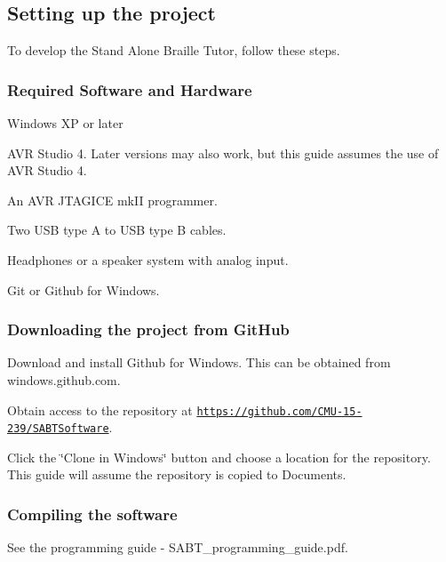 \subsection*{Setting up the project}

To develop the Stand Alone Braille Tutor, follow these steps.

\subsubsection*{Required Software and Hardware}


\begin{DoxyItemize}
\item Windows X\-P or later
\item A\-V\-R Studio 4. Later versions may also work, but this guide assumes the use of A\-V\-R Studio 4.
\item An A\-V\-R J\-T\-A\-G\-I\-C\-E mk\-I\-I programmer.
\item Two U\-S\-B type A to U\-S\-B type B cables.
\item Headphones or a speaker system with analog input.
\item Git or Github for Windows.
\end{DoxyItemize}

\subsubsection*{Downloading the project from Git\-Hub}


\begin{DoxyEnumerate}
\item Download and install Github for Windows. This can be obtained from windows.\-github.\-com.
\item Obtain access to the repository at \href{https://github.com/CMU-15-239/SABTSoftware}{\tt https\-://github.\-com/\-C\-M\-U-\/15-\/239/\-S\-A\-B\-T\-Software}.
\item Click the \char`\"{}\-Clone in Windows\char`\"{} button and choose a location for the repository. This guide will assume the repository is copied to Documents.
\end{DoxyEnumerate}

\subsubsection*{Compiling the software}

See the programming guide -\/ S\-A\-B\-T\-\_\-programming\-\_\-guide.\-pdf.

